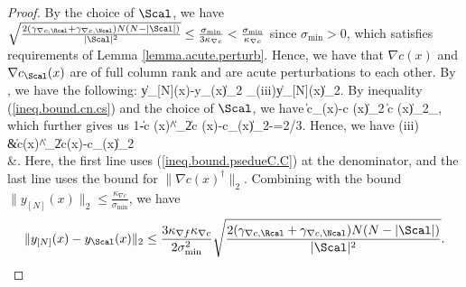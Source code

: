 \begin{proof}

	
By the choice of $\Scal$, we have $\sqrt{ \frac{2(\gamma_{\nabla c, \Rcal}+\gamma_{\nabla c, \Ncal})N(N-|\Scal|)}{|\Scal|^2}}\le \frac{\sigma_{\min}}{3\kappa_{\nabla c}}<\frac{\sigma_{\min}}{\kappa_{\nabla c}}$ since $\sigma_{\min}>0$, which satisfies requirements of Lemma \ref{lemma.acute.perturb}. Hence, we have that $\nabla c (x)$ and $\nabla c_\Scal(x)$ are of full column rank and are acute perturbations to each other. By \cite[Theorem 5.2]{396bf6e1-ef54-3bf6-a49b-862db8404076}, we have the following:
\bequation
\label{ineq.define.iii}
	\|y_{[N]}(x)-y_\Scal(x)\|_2
	\le {}_{(iii)}\|y_{[N]}(x)\|_2.
\eequation
	By inequality (\ref{ineq.bound.cn.cs}) and the choice of $\Scal$, we have
	\bequationNN
	\|\nabla c_\Scal(x)-\nabla c (x)\|_2
	\le{}\|\nabla c (x)\|_2\le {}\sigma_{\min},
\eequationNN
which further gives us
	\bequation
	\label{ineq.bound.psedueC.C}
		1-\|\nabla c (x)^\dag\|_2\|\nabla c (x)-\nabla c_\Scal(x)\|_2-=2/3.
	\eequation
	Hence, we have
	\bequation
	\label{ineq.bound.psi}
	\baligned
	(iii)
	&\le {}\|\nabla c(x)^\dag\|_2\|\nabla c(x)-\nabla c_\Scal(x)\|_2\\
	&\le {}.
\ealigned
\eequation
Here, the first line uses (\ref{ineq.bound.psedueC.C}) at the denominator, and the last line uses the bound for $\|\nabla c(x)^\dag\|_2$. Combining with the bound $\|y_{[N]}(x)\|_2\le\frac{\kappa_{\nabla c}}{\sigma_{\min}}$, we have
	\[
	\|y_{[N]}(x)-y_\Scal(x)\|_2
	 \le \frac{3\kappa_{\nabla f}\kappa_{\nabla c}}{2 \sigma_{\min}^2}\sqrt{ \frac{2(\gamma_{\nabla c, \Rcal}+\gamma_{\nabla c, \Ncal})N(N-|\Scal|)}{|\Scal|^2}}.
	\]
	

\end{proof}
